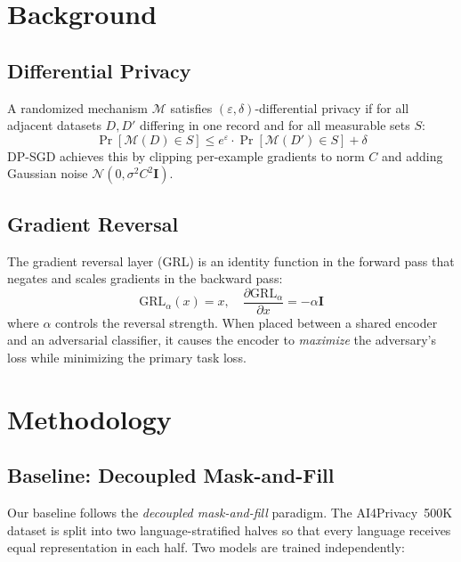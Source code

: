 \documentclass[11pt,a4paper]{article}
\begin{document}
\section{Background}
\label{sec:background}

\subsection{Differential Privacy}

A randomized mechanism $\mathcal{M}$ satisfies $(\varepsilon, \delta)$-differential
privacy if for all adjacent datasets $D, D'$ differing in one record and for
all measurable sets $S$:
\begin{equation}
    \Pr[\mathcal{M}(D) \in S] \leq e^{\varepsilon} \cdot \Pr[\mathcal{M}(D') \in S] + \delta
\end{equation}
DP-SGD achieves this by clipping per-example gradients to norm $C$ and adding
Gaussian noise $\mathcal{N}(0, \sigma^2 C^2 \mathbf{I})$.

\subsection{Gradient Reversal}

The gradient reversal layer (GRL) \cite{ganin2016domain} is an identity
function in the forward pass that negates and scales gradients in the backward
pass:
\begin{equation}
    \text{GRL}_\alpha(x) = x, \quad
    \frac{\partial \text{GRL}_\alpha}{\partial x} = -\alpha \mathbf{I}
\end{equation}
where $\alpha$ controls the reversal strength.  When placed between a shared
encoder and an adversarial classifier, it causes the encoder to \emph{maximize}
the adversary's loss while minimizing the primary task loss.

\section{Methodology}
\label{sec:method}

\subsection{Baseline: Decoupled Mask-and-Fill}
\label{sec:decoupled}

Our baseline follows the \emph{decoupled mask-and-fill} paradigm.  The
AI4Privacy~500K dataset is split into two language-stratified halves so that
every language receives equal representation in each half.  Two models are
trained independently:
\end{document}
